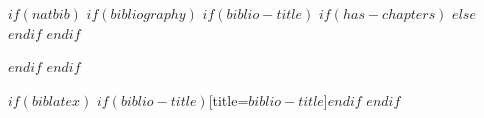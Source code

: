 \newpage
$if(natbib)$
$if(bibliography)$
$if(biblio-title)$
\clearpage
$if(has-chapters)$
\clearpage
\renewcommand\bibname{$biblio-title$}
$else$
\renewcommand\refname{$biblio-title$}
$endif$
$endif$

$endif$
$endif$

$if(biblatex)$
\printbibliography
$if(biblio-title)$[title=$biblio-title$]$endif$
$endif$

